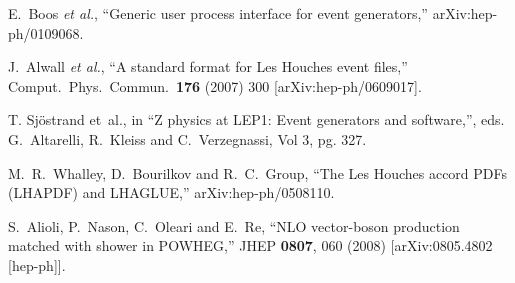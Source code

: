 \documentclass[paper]{JHEP3}
\begin{document}
\begin{thebibliography}{10}
  E.~Boos {\it et al.},
  ``Generic user process interface for event generators,''
  arXiv:hep-ph/0109068.

  J.~Alwall {\it et al.},
  ``A standard format for Les Houches event files,''
  Comput.\ Phys.\ Commun.\  {\bf 176} (2007) 300
  [arXiv:hep-ph/0609017].


 T. Sj\"ostrand et~al., in
  ``Z physics at LEP1: Event generators and software,'',  eds.
  G.~Altarelli, R.~Kleiss and C.~Verzegnassi, Vol 3, pg. 327.


  M.~R.~Whalley, D.~Bourilkov and R.~C.~Group,
  ``The Les Houches accord PDFs (LHAPDF) and LHAGLUE,''
  arXiv:hep-ph/0508110.


  S.~Alioli, P.~Nason, C.~Oleari and E.~Re,
  ``NLO vector-boson production matched with shower in POWHEG,''
  JHEP {\bf 0807}, 060 (2008)
  [arXiv:0805.4802 [hep-ph]].




\end{thebibliography}
\end{document}
